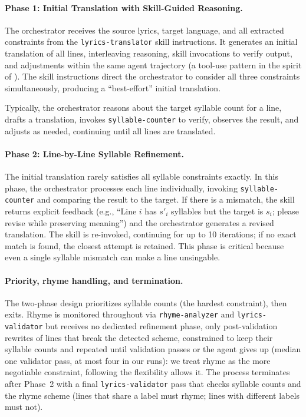 \documentclass[11pt]{article}
\begin{document}
\paragraph{Phase 1: Initial Translation with Skill-Guided Reasoning.}
The orchestrator receives the source lyrics, target language, and all extracted constraints from the \texttt{lyrics-translator} skill instructions.
It generates an initial translation of all lines, interleaving reasoning, skill invocations to verify output, and adjustments within the same agent trajectory (a tool-use pattern in the spirit of \citet{yao-etal-2023-react}).
The skill instructions direct the orchestrator to consider all three constraints simultaneously, producing a ``best-effort'' initial translation.

Typically, the orchestrator reasons about the target syllable count for a line, drafts a translation, invokes \texttt{syllable-counter} to verify, observes the result, and adjusts as needed, continuing until all lines are translated.

\paragraph{Phase 2: Line-by-Line Syllable Refinement.}
The initial translation rarely satisfies all syllable constraints exactly.
In this phase, the orchestrator processes each line individually, invoking \texttt{syllable-counter} and comparing the result to the target.
If there is a mismatch, the skill returns explicit feedback (e.g., ``Line $i$ has $s'_i$ syllables but the target is $s_i$; please revise while preserving meaning'') and the orchestrator generates a revised translation.
The skill is re-invoked, continuing for up to 10 iterations; if no exact match is found, the closest attempt is retained.
This phase is critical because even a single syllable mismatch can make a line unsingable.

\paragraph{Priority, rhyme handling, and termination.}
The two-phase design prioritizes syllable counts (the hardest constraint), then exits.
Rhyme is monitored throughout via \texttt{rhyme-analyzer} and \texttt{lyrics-validator} but receives no dedicated refinement phase, only post-validation rewrites of lines that break the detected scheme, constrained to keep their syllable counts and repeated until validation passes or the agent gives up (median one validator pass, at most four in our runs): we treat rhyme as the more negotiable constraint, following the flexibility \citet{low-2005-pentathlon} allows it.
The process terminates after Phase~2 with a final \texttt{lyrics-validator} pass that checks syllable counts and the rhyme scheme (lines that share a label must rhyme; lines with different labels must not).
\end{document}
